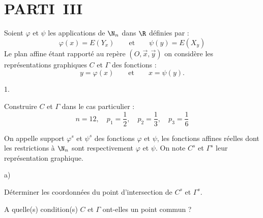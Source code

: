 \documentclass[11pt]{article}%
\begin{document}
\section*{PARTI\E\ III}

Soient $\varphi $ et $\psi $ les applications de $\N_{n}$ dans $\R$
définies par :
\[
\varphi (x) = E(Y_{x})\qquad \text{et}\qquad \psi (y) = E(X_{y})
\]
Le plan affine étant rapporté au repère
$(O,\overrightarrow{x},\overrightarrow{y})$ on considère les
représentations graphiques $C$ et $\Gamma $ des fonctions :
\[
y = \varphi (x)\qquad \text{et}\qquad x = \psi (y).
\]

\begin{noliste}{1.}
 \setlength{\itemsep}{4mm}
\item Construire $C$ et $\Gamma $ dans le cas particulier :
\[
n = 12,\quad p_{1} = \dfrac{1}{2},\quad p_{2} = \dfrac{1}{3},\quad
p_{3} = \dfrac{1}{6}
\]

\item On appelle support $\varphi ^{s}$ et $\psi ^{s}$ des fonctions
$\varphi $ et $\psi $, les fonctions affines réelles dont les
restrictions à $\N_{n}$ sont respectivement $\varphi $ et $\psi.$ On
note $C^{s}$
et $\Gamma ^{s}$ leur représentation graphique.

\begin{noliste}{a)}
 \setlength{\itemsep}{2mm}
\item Déterminer les coordonnées du point d'intersection de $C^{s}$ et
$\Gamma ^{s}.$

\item A quelle(s) condition(s) $C$ et $\Gamma $ ont-elles un point
commun ?
\end{noliste}
\end{noliste}

\label{fin}
\end{document}
